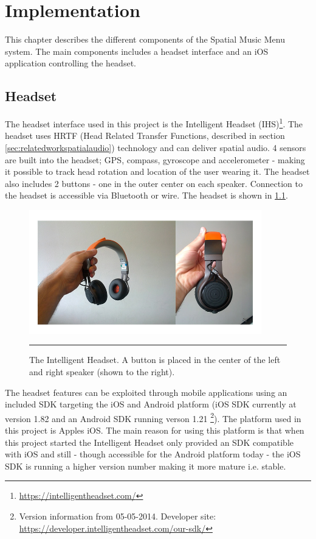 \chapter{Implementation}
This chapter describes the different components of the Spatial Music Menu system. The main components includes a headset interface and an iOS application controlling the headset.


\section{Headset}
The headset interface used in this project is the Intelligent Headset (IHS)\footnote{\url{https://intelligentheadset.com/}}. The headset uses HRTF (Head Related Transfer Functions, described in section \ref{sec:relatedworkspatialaudio}) technology and can deliver spatial audio. 4 sensors are built into the headset; GPS, compass, gyroscope and accelerometer - making it possible to track head rotation and location of the user wearing it. The headset also includes 2 buttons - one in the outer center on each speaker. Connection to the headset is accessible via Bluetooth or wire. The headset is shown in \ref{fig:headset}.

\begin{figure}[h]
	\centering
		\includegraphics[width=0.9\textwidth,height=\textheight,keepaspectratio]{./Figures/headset.jpg}
		\rule{35em}{1pt}
	\caption[The Intelligent Headset]{The Intelligent Headset. A button is placed in the center of the left and right speaker (shown to the right).}
	\label{fig:headset}
\end{figure}

The headset features can be exploited through mobile applications using an included SDK targeting the iOS and Android platform (iOS SDK currently at version 1.82 and an Android SDK running verson 1.21 \footnote{Version information from 05-05-2014. Developer site: \url{https://developer.intelligentheadset.com/our-sdk/}}). The platform used in this project is Apples iOS. The main reason for using this platform is that when this project started the Intelligent Headset only provided an SDK compatible with iOS and still - though accessible for the Android platform today - the iOS SDK is running a higher version number making it more mature i.e. stable.

